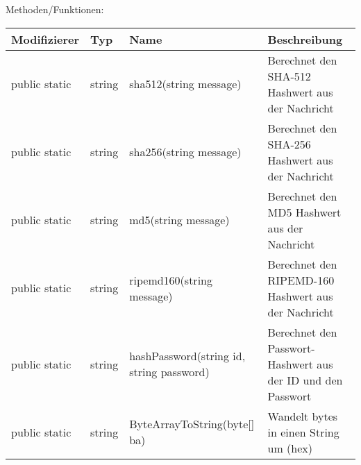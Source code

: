 Methoden/Funktionen:\\

\begin{tabular}[h]{l|l|l|p{5cm}}
Modifizierer & Typ & Name & Beschreibung\\
\hline
public static & string & sha512(string message) & Berechnet den SHA-512 Hashwert aus der Nachricht\\
\hline
public static & string & sha256(string message) & Berechnet den SHA-256 Hashwert aus der Nachricht\\
\hline
public static & string & md5(string message) & Berechnet den MD5 Hashwert aus der Nachricht\\
\hline
public static & string & ripemd160(string message) & Berechnet den RIPEMD-160 Hashwert aus der Nachricht\\
\hline
public static & string & hashPassword(string id, string password) & Berechnet den Passwort-Hashwert aus der ID und den Passwort\\
\hline
public static & string & ByteArrayToString(byte[] ba) & Wandelt bytes in einen String um (hex)\\
\end{tabular}









